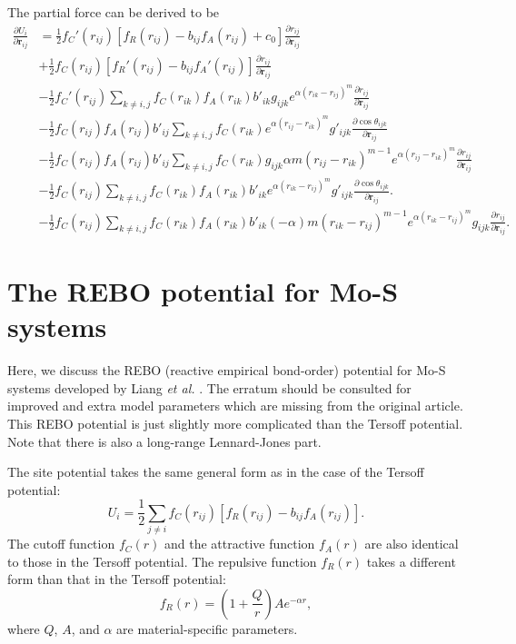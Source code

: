 \documentclass[12pt,a4paper]{report}
\newcommand{\vect}[1]{\boldsymbol{#1}}
\begin{document}
The partial force can be derived to be
\begin{align}
\frac{\partial U_i}{\partial \vect{r}_{ij}}
&= \frac{1}{2}f_C'(r_{ij})[f_R(r_{ij})-b_{ij}f_A(r_{ij})+c_0]\frac{\partial r_{ij}}{\partial \vect{r}_{ij}} \nonumber \\
&+ \frac{1}{2}f_C(r_{ij})[f_R'(r_{ij})-b_{ij}f_A'(r_{ij})]\frac{\partial r_{ij}}{\partial \vect{r}_{ij}} \nonumber \\
&- \frac{1}{2}f_C'(r_{ij})\sum_{k\neq i,j}f_C(r_{ik})f_A(r_{ik})b'_{ik}g_{ijk} e^{\alpha (r_{ik}-r_{ij})^m}\frac{\partial r_{ij}}{\partial \vect{r}_{ij}} \nonumber \\
&- \frac{1}{2}f_C(r_{ij})f_A(r_{ij})b'_{ij}\sum_{k\neq i,j}f_C(r_{ik}) e^{\alpha (r_{ij}-r_{ik})^m} g'_{ijk}
   \frac{\partial \cos\theta_{ijk}}{\partial \vect{r}_{ij}} \nonumber \\
&- \frac{1}{2}f_C(r_{ij})f_A(r_{ij})b'_{ij}\sum_{k\neq i,j}f_C(r_{ik}) g_{ijk} \alpha m (r_{ij}-r_{ik})^{m-1} e^{\alpha (r_{ij}-r_{ik})^m}
   \frac{\partial r_{ij}}{\partial \vect{r}_{ij}} \nonumber \\
&- \frac{1}{2}f_C(r_{ij})\sum_{k\neq i,j}f_C(r_{ik})f_A(r_{ik})b'_{ik} e^{\alpha (r_{ik}-r_{ij})^m} g'_{ijk}
   \frac{\partial \cos\theta_{ijk}}{\partial \vect{r}_{ij}}. \nonumber \\
&- \frac{1}{2}f_C(r_{ij})\sum_{k\neq i,j}f_C(r_{ik})f_A(r_{ik})b'_{ik} (-\alpha) m (r_{ik}-r_{ij})^{m-1} e^{\alpha (r_{ik}-r_{ij})^m}
   g_{ijk} \frac{\partial r_{ij}}{\partial \vect{r}_{ij}}.
\end{align}



\section{The REBO potential for Mo-S systems}

Here, we discuss the REBO (reactive empirical bond-order) potential for Mo-S systems developed by Liang \textit{et al.} \cite{liang2009prb}. The erratum \cite{liang2012prb_erratum} should be consulted for improved and extra model parameters which are missing from the original article. This REBO potential is just slightly more complicated than the Tersoff potential. Note that there is also a long-range Lennard-Jones part.


The site potential takes the same general form as in the case of the Tersoff potential:
\begin{equation}
U_i =  \frac{1}{2} \sum_{j \neq i} f_C(r_{ij}) \left[ f_R(r_{ij}) - b_{ij} f_A(r_{ij}) \right].
\end{equation}
The cutoff function $f_{C}(r)$ and the attractive function $f_{A}(r)$ are also identical to those in the Tersoff potential. The repulsive function $f_{R}(r)$ takes a different form than that in the Tersoff potential:
\begin{equation}
f_{R}(r) = \left(1+\frac{Q}{r}\right) A e^{-\alpha r},
\end{equation}
where $Q$, $A$, and $\alpha$ are material-specific parameters.
\end{document}
